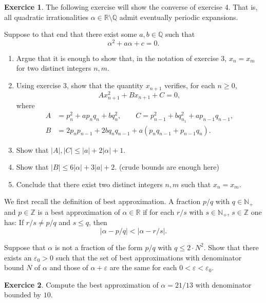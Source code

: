 \documentclass[12pt,a4paper]{article}
\theoremstyle{plain}
\newtheorem*{Sol*}{Solution}
\theoremstyle{definition}
\newtheorem{Ex}{Exercice}
\def \Q {\mathbb Q}
\def \R {\mathbb R}
\newif\ifsolutions
\newcommand{\exercise}[2]{
			\begin{Ex} #1 \end{Ex}
			\ifsolutions  \begin{Sol*} #2 \end{Sol*} \bigskip \else \bigskip  \fi
		}
\begin{document}
\exercise{
	The following exercise will show the converse of exercise 4.
	That is, all quadratic irrationalities $\alpha \in \R\setminus\Q$ admit eventually periodic expansions.
	
	Suppose to that end that there exist some $a, b \in \Q$ such that
		\[ \alpha^2 + a \alpha + c = 0. \]

	\begin{enumerate}
		\item Argue that it is enough to show that, in the notation of exercise 3, $x_n = x_m$ for two distinct integers $n, m$.
		\item Using exercise 3, show that the quantity $x_{n+1}$ verifies, for each $n\geq0$,
			\[ Ax_{n+1}^2 + Bx_{n+1} + C = 0, \]
		where
			\begin{align*}
			 A &= p_n^2 + a p_n q_n + b q_n^2,
			\qquad C = p_{n-1}^2 + b q_{n_1}^2 + a p_{n-1}q_{n-1},\\
			 B &= 2p_n p_{n-1} + 2b q_n q_{n-1} + a(p_n q_{n-1} + p_{n-1}q_{n}).
			\end{align*}
		\item Show that $|A|, |C| \leq |a| + 2|\alpha|+1$.
		\item Show that $|B| \leq 6|\alpha| + 3|a| + 2$. (crude bounds are enough here)
		\item Conclude that there exist two distinct integers $n, m$ such that $x_n = x_m$.
	\end{enumerate}
}


\exercise{
  We first recall the definition of best approximation. A fraction $p/q$  with $q ∈ ℕ_+$ and $p ∈ℤ$ is a best approximation of $α∈ℝ$ if for each $r/s$ with $s ∈ ℕ_+$, $s∈ ℤ$ one has: If $r/s ≠ p/q$ and $s ≤ q$, then
  \begin{displaymath}
    | α - p/q | < |α - r/s|.   
  \end{displaymath}

  Suppose that $α$ is not a fraction of the form $p/q$ with $q≤2 ⋅N^2$. 
  Show that there exists an $ε_0>0$ such that the set of best approximations with denominator bound $N$ of $α$ and those of  $α +ε$ are the same for each $0<ε < ε_0$. 
}{}

\exercise{Compute the best approximation of $α = 21/13$ with denominator bounded by $10$.}{}
\end{document}
